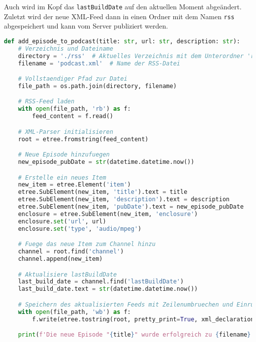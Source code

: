\documentclass{article}
\begin{document}
Auch wird im Kopf das \texttt{lastBuildDate} auf den aktuellen Moment abgeändert. Zuletzt wird der neue XML-Feed dann in einen Ordner mit dem Namen \texttt{rss} abgespeichert und kann vom Server publiziert werden.

\begin{lstlisting}[language=Python, caption=Vollständige Funktion des RSS-Feed Generators]
def add_episode_to_podcast(title: str, url: str, description: str):
    # Verzeichnis und Dateiname
    directory = './rss'  # Aktuelles Verzeichnis mit dem Unterordner 'rss'
    filename = 'podcast.xml'  # Name der RSS-Datei

    # Vollstaendiger Pfad zur Datei
    file_path = os.path.join(directory, filename)

    # RSS-Feed laden
    with open(file_path, 'rb') as f:
        feed_content = f.read()

    # XML-Parser initialisieren
    root = etree.fromstring(feed_content)

    # Neue Episode hinzufuegen
    new_episode_pubDate = str(datetime.datetime.now())

    # Erstelle ein neues Item
    new_item = etree.Element('item')
    etree.SubElement(new_item, 'title').text = title
    etree.SubElement(new_item, 'description').text = description
    etree.SubElement(new_item, 'pubDate').text = new_episode_pubDate
    enclosure = etree.SubElement(new_item, 'enclosure')
    enclosure.set('url', url)
    enclosure.set('type', 'audio/mpeg')

    # Fuege das neue Item zum Channel hinzu
    channel = root.find('channel')
    channel.append(new_item)

    # Aktualisiere lastBuildDate
    last_build_date = channel.find('lastBuildDate')
    last_build_date.text = str(datetime.datetime.now())

    # Speichern des aktualisierten Feeds mit Zeilenumbruechen und Einrueckungen
    with open(file_path, 'wb') as f:
        f.write(etree.tostring(root, pretty_print=True, xml_declaration=True, encoding='UTF-8'))

    print(f'Die neue Episode "{title}" wurde erfolgreich zu {filename} hinzugefuegt.')
\end{lstlisting}

\newpage



\end{document}

